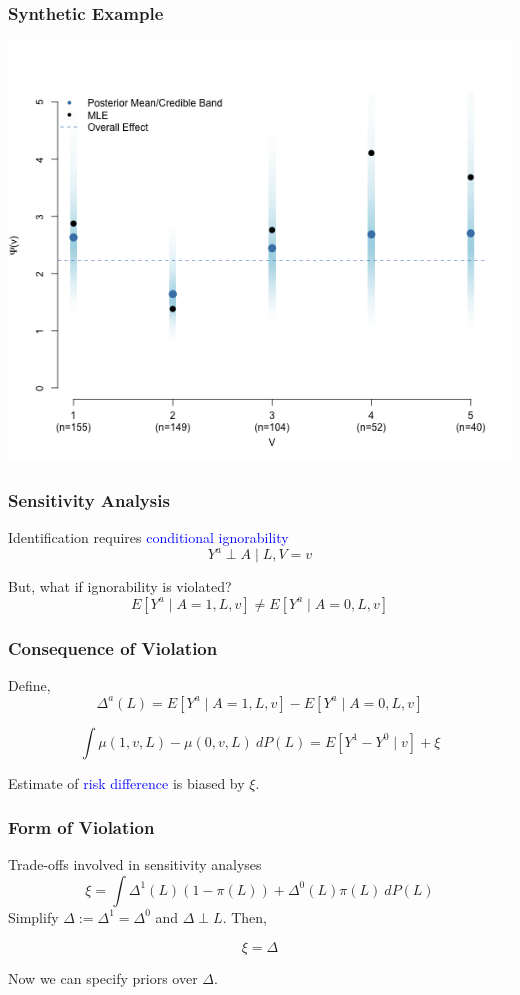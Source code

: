 \documentclass[xcolor=x11names,compress]{beamer}
\renewcommand{\(}{\begin{columns}}
\renewcommand{\)}{\end{columns}}
\newcommand{\<}[1]{\begin{column}{#1}}
\renewcommand{\>}{\end{column}}
\begin{document}
\begin{frame}
	\frametitle{Synthetic Example}
	\centerline{\includegraphics[scale=.4]{code/ppooling_plot.png}}
\end{frame}


\begin{frame}
	\frametitle{Sensitivity Analysis}
	
	Identification requires \textcolor{blue}{conditional ignorability}
	$$ Y^a \perp A \mid L, V=v $$

	But, what if ignorability is violated?
	$$ E[Y^a \mid A=1, L, v] \neq E[Y^a \mid A=0, L, v]  $$
\end{frame}

\begin{frame}
	\frametitle{Consequence of Violation}
	
	Define, 	
	$$\Delta^a(L)  = E[Y^a \mid A=1, L, v] - E[Y^a \mid A=0, L, v] $$
	
	\pause
	$$\int \mu(1,v, L) - \mu(0, v, L) \ dP(L)  = E[Y^1 - Y^0 \mid v ] + \xi$$
	
	Estimate of \textcolor{blue}{risk difference} is biased by $\xi$.
		
\end{frame}


\begin{frame}
	\frametitle{Form of Violation}
	Trade-offs involved in sensitivity analyses
	$$ \xi = \int \Delta^1(L)(1- \pi(L)) + \Delta^0(L) \pi(L)  \ dP(L) $$
	Simplify $ \Delta := \Delta^1 = \Delta^0$ and $ \Delta \perp L$. Then, 
	
	$$ \xi = \Delta $$
	
	Now we can specify priors over $\Delta$.
\end{frame}
\end{document}
